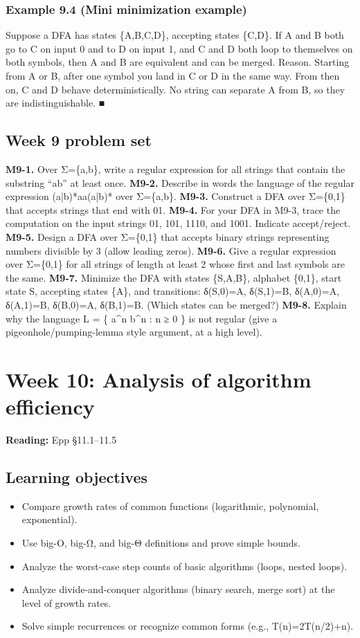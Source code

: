 \documentclass[11pt]{article}
\begin{document}
\subsubsection*{Example 9.4 (Mini minimization example)}
Suppose a DFA has states \{A,B,C,D\}, accepting states \{C,D\}. If A and B both go to
C on input 0 and to D on input 1, and C and D both loop to themselves on both
symbols, then A and B are equivalent and can be merged.
Reason. Starting from A or B, after one symbol you land in C or D in the same way.
From then on, C and D behave deterministically. No string can separate A from B,
so they are indistinguishable. ■
\subsection*{Week 9 problem set}
\textbf{M9-1.} Over Σ=\{a,b\}, write a regular expression for all strings that contain the substring
“ab” at least once.
\textbf{M9-2.} Describe in words the language of the regular expression (a|b)*aa(a|b)* over
Σ=\{a,b\}.
\textbf{M9-3.} Construct a DFA over Σ=\{0,1\} that accepts strings that end with 01.
\textbf{M9-4.} For your DFA in M9-3, trace the computation on the input strings 01, 101, 1110,
and 1001. Indicate accept/reject.
\textbf{M9-5.} Design a DFA over Σ=\{0,1\} that accepts binary strings representing numbers
divisible by 3 (allow leading zeros).
\textbf{M9-6.} Give a regular expression over Σ=\{0,1\} for all strings of length at least 2 whose
first and last symbols are the same.
\textbf{M9-7.} Minimize the DFA with states \{S,A,B\}, alphabet \{0,1\}, start state S, accepting
states \{A\}, and transitions: δ(S,0)=A, δ(S,1)=B, δ(A,0)=A, δ(A,1)=B, δ(B,0)=A,
δ(B,1)=B. (Which states can be merged?)
\textbf{M9-8.} Explain why the language L = \{ a\textasciicircum{}n b\textasciicircum{}n : n ≥ 0 \} is not regular (give a
pigeonhole/pumping-lemma style argument, at a high level).

\clearpage
\section{Week 10: Analysis of algorithm efficiency}
\textbf{Reading:} Epp §11.1–11.5
\subsection*{Learning objectives}
\begin{itemize}[leftmargin=*,itemsep=0.25em]
\item Compare growth rates of common functions (logarithmic, polynomial, exponential).
\item Use big-O, big-Ω, and big-Θ definitions and prove simple bounds.
\item Analyze the worst-case step counts of basic algorithms (loops, nested loops).
\item Analyze divide-and-conquer algorithms (binary search, merge sort) at the level of growth rates.
\item Solve simple recurrences or recognize common forms (e.g., T(n)=2T(n/2)+n).
\end{itemize}
\end{document}
